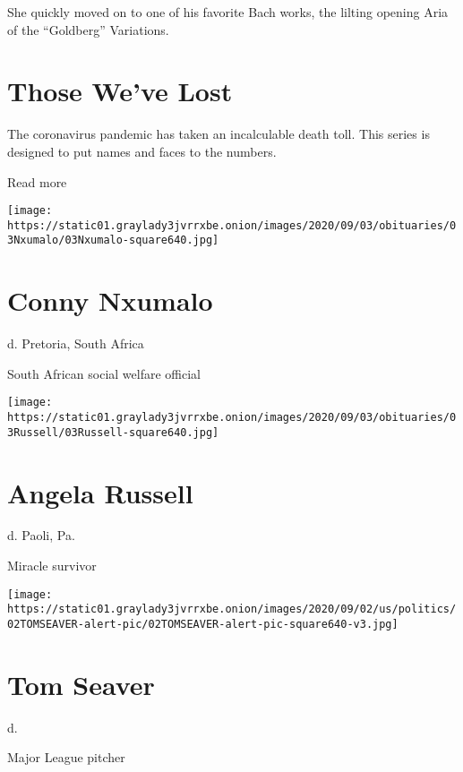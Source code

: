 She quickly moved on to one of his favorite Bach works, the lilting
opening Aria of the ``Goldberg'' Variations.

\href{https://www.nytimes3xbfgragh.onion/interactive/2020/obituaries/people-died-coronavirus-obituaries.html?action=click\&pgtype=Article\&state=default\&region=BELOW_MAIN_CONTENT\&context=covid_obits_promo}{}

\hypertarget{those-weve-lost}{%
\section{Those We've Lost}\label{those-weve-lost}}

The coronavirus pandemic has taken an incalculable death toll. This
series is designed to put names and faces to the numbers.

Read more

\texttt{[image: https://static01.graylady3jvrrxbe.onion/images/2020/09/03/obituaries/03Nxumalo/03Nxumalo-square640.jpg]}

\hypertarget{conny-nxumalo}{%
\section{Conny Nxumalo}\label{conny-nxumalo}}

d. Pretoria, South Africa

South African social welfare official

\texttt{[image: https://static01.graylady3jvrrxbe.onion/images/2020/09/03/obituaries/03Russell/03Russell-square640.jpg]}

\hypertarget{angela-russell}{%
\section{Angela Russell}\label{angela-russell}}

d. Paoli, Pa.

Miracle survivor

\texttt{[image: https://static01.graylady3jvrrxbe.onion/images/2020/09/02/us/politics/02TOMSEAVER-alert-pic/02TOMSEAVER-alert-pic-square640-v3.jpg]}

\hypertarget{tom-seaver}{%
\section{Tom Seaver}\label{tom-seaver}}

d.

Major League pitcher


